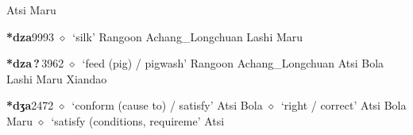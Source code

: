 \begin{list}{}{\leftmargin=1.5em \itemindent=-1.5em}
         Atsi 
\hspace{1ex}
         Maru 
  \item {\footnotesize \textbf{*dza}}{\tiny 9993}
\hspace{1ex}
         $\diamond$~`silk'
         Rangoon 
\hspace{1ex}
         Achang\_Longchuan 
\hspace{1ex}
         Lashi 
\hspace{1ex}
         Maru 
  \item {\footnotesize \textbf{*dza\,?\,}}{\tiny 3962}
\hspace{1ex}
         $\diamond$~`feed (pig) / pigwash'
         Rangoon 
\hspace{1ex}
         Achang\_Longchuan 
\hspace{1ex}
         Atsi 
\hspace{1ex}
         Bola 
\hspace{1ex}
         Lashi 
\hspace{1ex}
         Maru 
\hspace{1ex}
         Xiandao 
  \item {\footnotesize \textbf{*dʒa}}{\tiny 2472}
\hspace{1ex}
         $\diamond$~`conform (cause to) / satisfy'
         Atsi 
\hspace{1ex}
         Bola 
\hspace{1ex}
         $\diamond$~`right / correct'
         Atsi 
\hspace{1ex}
         Bola 
\hspace{1ex}
         Maru 
\hspace{1ex}
         $\diamond$~`satisfy (conditions, requireme'
         Atsi 

\end{list}
